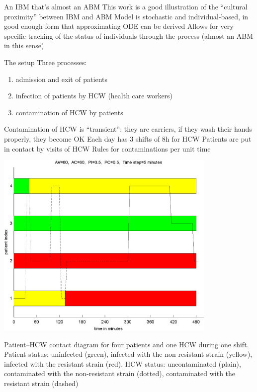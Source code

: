 \documentclass[aspectratio=43]{beamer}
\begin{document}
\begin{frame}{An IBM that's almost an ABM}
This work is a good illustration of the ``cultural proximity'' between IBM and ABM
\vfill
Model is stochastic and individual-based, in good enough form that approximating ODE can be derived
\vfill
Allows for very specific tracking of the status of individuals through the process (almost an ABM in this sense)
\end{frame} 


\begin{frame}{The setup}
Three processes:
\begin{enumerate}
\item admission and exit of patients
\item infection of patients by HCW (health care workers) 
\item contamination of HCW by patients
\end{enumerate}

\vfill
Contamination of HCW is ``transient'': they are carriers, if they wash their hands properly, they become OK
\vfill
Each day has 3 shifts of 8h for HCW
\vfill
Patients are put in contact by visits of HCW
\vfill
Rules for contaminations per unit time
\end{frame} 


\begin{frame}

\begin{center}
\includegraphics[width=0.8\textwidth]{FIGS/Dagata_etal_patients_profiles.jpg}
\end{center}
\vfill
\tiny Patient–HCW contact diagram for four patients and one HCW during one shift. Patient status: uninfected (green), infected with the non-resistant strain (yellow), infected with the resistant strain (red). HCW status: uncontaminated (plain), contaminated with the non-resistant strain (dotted), contaminated with the resistant strain (dashed)
\end{frame}
\end{document}
